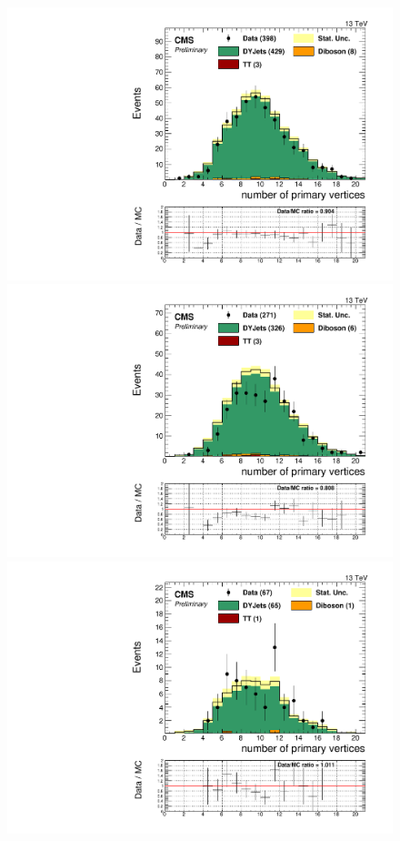 \begin{figure}[h]
\begin{center}
\includegraphics[scale=0.37]{figures/control/nVtxMLP.pdf}
\includegraphics[scale=0.37]{figures/control/nVtxELP.pdf}\\ [2cm]
\includegraphics[scale=0.37]{figures/control/nVtxMHP.pdf}

\end{center}
\end{figure}

